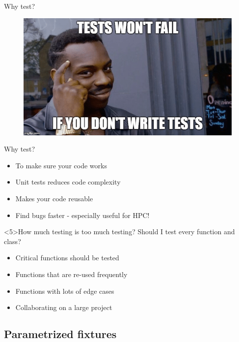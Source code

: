 \documentclass[t]{beamer}
\begin{document}
\begin{frame}{Why test?}
    \begin{figure}
        \centering
        \includegraphics[width=\linewidth]{figures/testing_meme.png}
    \end{figure}
\end{frame}

\begin{frame}{Why test?}
    \begin{itemize}
        \item<1> To make sure your code works
        \item<2> Unit tests reduces code complexity
        \item<3> Makes your code reusable
        \item<4> Find bugs faster - especially useful for HPC! 
    \end{itemize}
    \begin{block}<5>{How much testing is too much testing?}
        Should I test every function and class?
        \begin{itemize}
            \item Critical functions should be tested
            \item Functions that are re-used frequently
            \item Functions with lots of edge cases
            \item Collaborating on a large project
        \end{itemize}
    \end{block}
\end{frame}

\subsection{Parametrized fixtures}
\end{document}
